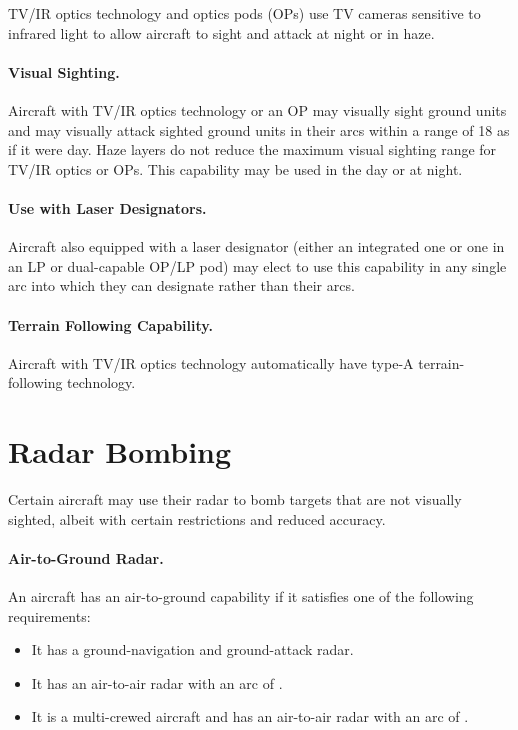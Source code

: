 \begin{advancedrules}
{TV/IR optics technology and optics pods (OPs) use TV cameras sensitive to infrared light to allow aircraft to sight and attack at night or in haze.

\paragraph{Visual Sighting.} Aircraft with TV/IR optics technology or an OP may visually sight ground units and may visually attack sighted ground units in their  arcs within a range of 18 as if it were day. Haze layers do not reduce the maximum visual sighting range for TV/IR optics or OPs. This capability may be used in the day or at night. 

\paragraph{Use with Laser Designators.} Aircraft also equipped with a laser designator (either an integrated one or one in an LP or dual-capable OP/LP pod) may elect to use this capability in any single arc into which they can designate rather than their  arcs.

\paragraph{Terrain Following Capability.} Aircraft with TV/IR optics technology automatically have type-A terrain-following technology.

\section{Radar Bombing}

Certain aircraft may use their radar to bomb targets that are not visually sighted, albeit with certain restrictions and reduced accuracy.

\paragraph{Air-to-Ground Radar.} An aircraft has an air-to-ground capability if it satisfies one of the following requirements: 
\begin{itemize}
\item It has a ground-navigation and ground-attack radar.
\item It has an air-to-air radar with an arc of .
\item It is a multi-crewed aircraft and has an air-to-air radar with an arc of .
\end{itemize}

}
\end{advancedrules}
